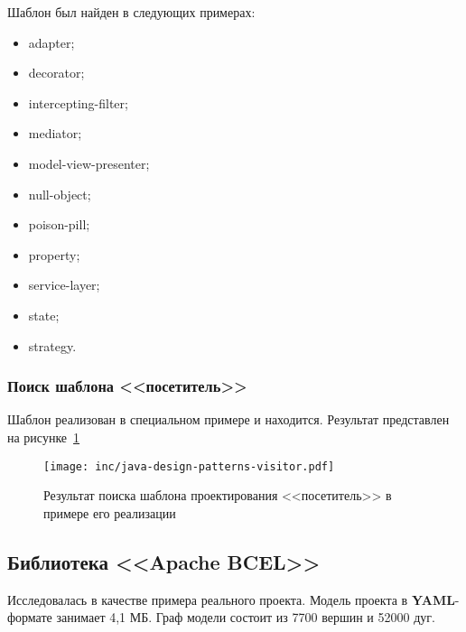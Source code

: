 Шаблон был найден в следующих примерах:
\begin{itemize}
\item adapter;
\item decorator;
\item intercepting-filter;
\item mediator;
\item model-view-presenter;
\item null-object;
\item poison-pill;
\item property;
\item service-layer;
\item state;
\item strategy.
\end{itemize}

\subsubsection*{Поиск шаблона <<посетитель>>}

Шаблон реализован в специальном примере и находится.
Результат представлен на рисунке~\ref{fig:java-design-patterns-visitor}

\begin{figure}[!ht]
\centering
\texttt{[image: inc/java-design-patterns-visitor.pdf]}
\caption{Результат поиска шаблона проектирования <<посетитель>> в примере его реализации}
\label{fig:java-design-patterns-visitor}
\end{figure}

\subsection{Библиотека <<Apache BCEL>>}

Исследовалась в качестве примера реального проекта.
Модель проекта в \textbf{YAML}-формате занимает 4,1 МБ.
Граф модели состоит из 7700 вершин и 52000 дуг.
